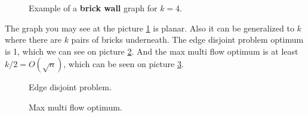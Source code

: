 \begin{figure}[!ht]
	\caption{Example of a \textbf{brick wall} graph for $k = 4$.}
	\label{brick-wall}
\end{figure}

The graph you may see at the picture \ref{brick-wall} is planar. Also it can be generalized to $k$ where there are $k$ pairs of bricks underneath. The edge disjoint problem optimum is 1, which we can see on picture \ref{edg}. And the max multi flow optimum is at least $k/2 = O(\sqrt{n})$, which can be seen on picture \ref{max-flow}.


\begin{figure}[!ht]\centering
	\caption{Edge disjoint problem.}
	\label{edg}
\end{figure}

\begin{figure}[!ht]\centering
	\caption{Max multi flow optimum.}
	\label{max-flow}
\end{figure}